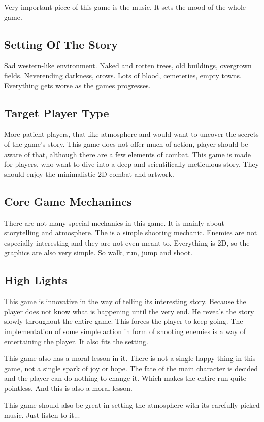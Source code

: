 \documentclass{article}
\begin{document}
    Very important piece of this game is the music. It sets the mood of the whole game.
\subsection{Setting Of The Story}
Sad western-like environment. Naked and rotten trees, old buildings, overgrown fields.
Neverending darkness, crows. Lots of blood, cemeteries, empty towns. Everything gets
worse as the games progresses. 
\subsection{Target Player Type}
More patient players, that like atmosphere and would want to uncover the secrets of the
game's story. This game does not offer much of action, player should be aware of that,
although there are a few elements of combat. This game is made for players, who want
to dive into a deep and scientifically meticulous story. They should
enjoy the minimalistic 2D combat and artwork.
\subsection{Core Game Mechanincs}
There are not many special mechanics in this game. It is mainly about storytelling and
atmosphere. The is a simple shooting mechanic. Enemies are not especially interesting
and they are not even meant to. Everything is 2D, so the graphics are also very simple.
So walk, run, jump and shoot.
\subsection{High Lights}
This game is innovative in the way of telling its interesting story. Because the player
does not know what is happening until the very end. He reveals the story slowly throughout
the entire game. This forces the player to keep going. The implementation of some simple
action in form of shooting enemies is a way of entertaining the player. It also fits the
setting.

This game also has a moral lesson in it. There is not a single happy thing in this game,
not a single spark of joy or hope. The fate of the main character is decided and the player can do nothing
to change it. Which makes the entire run quite pointless. And this is also a moral lesson.

This game should also be great in setting the atmosphere with its carefully picked
music. Just listen to it...
\cleardoublepage
\end{document}
